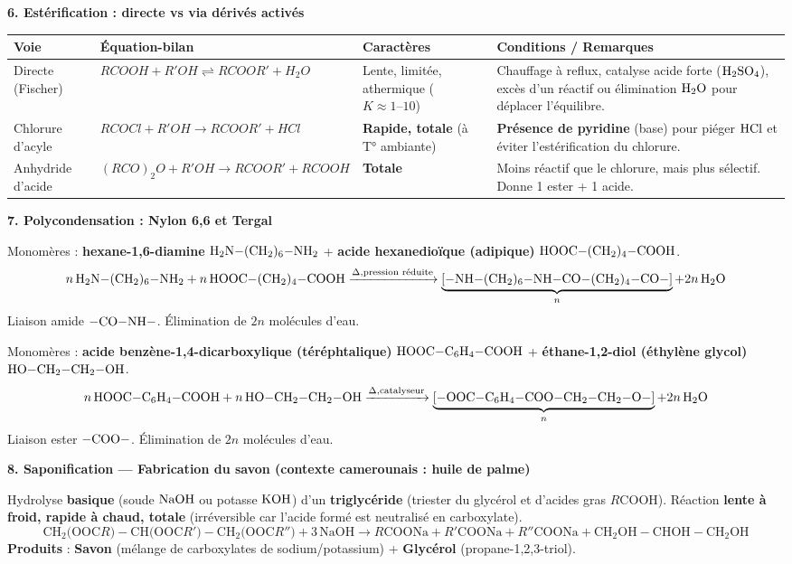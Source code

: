 \documentclass[11pt]{article}
\begin{document}
\begin{aretenir}
\textbf{6. Estérification : directe vs via dérivés activés}
\begin{center}
\begin{tabularx}{\linewidth}{|l|X|X|X|}
\hline
\rowcolor{popblueL} \textbf{Voie} & \textbf{Équation-bilan} & \textbf{Caractères} & \textbf{Conditions / Remarques} \\
\hline
Directe (Fischer) & $RCOOH + R'OH \rightleftharpoons RCOOR' + H_2O$ & Lente, limitée, athermique ($K \approx 1\text{--}10$) & Chauffage à reflux, catalyse acide forte ($\ce{H2SO4}$), excès d'un réactif ou élimination $\ce{H2O}$ pour déplacer l'équilibre. \\
\hline
Chlorure d'acyle & $RCOCl + R'OH \rightarrow RCOOR' + HCl$ & \textbf{Rapide, totale} (à T° ambiante) & \textbf{Présence de pyridine} (base) pour piéger $\ce{HCl}$ et éviter l'estérification du chlorure. \\
\hline
Anhydride d'acide & $(RCO)_2O + R'OH \rightarrow RCOOR' + RCOOH$ & \textbf{Totale} & Moins réactif que le chlorure, mais plus sélectif. Donne 1 ester + 1 acide. \\
\hline
\end{tabularx}
\end{center}

\textbf{7. Polycondensation : Nylon 6,6 et Tergal}
\begin{exemplebox}
Monomères : \textbf{hexane-1,6-diamine} $\ce{H2N-(CH2)6-NH2}$ + \textbf{acide hexanedioïque (adipique)} $\ce{HOOC-(CH2)4-COOH}$.
\[ n\,\ce{H2N-(CH2)6-NH2} + n\,\ce{HOOC-(CH2)4-COOH} \xrightarrow{\Delta, \text{pression réduite}} \underbrace{\ce{[-NH-(CH2)6-NH-CO-(CH2)4-CO-]}}_n + 2n\,\ce{H2O} \]
Liaison amide $\ce{-CO-NH-}$. Élimination de $2n$ molécules d'eau.
\end{exemplebox}

\begin{exemplebox}
Monomères : \textbf{acide benzène-1,4-dicarboxylique (téréphtalique)} $\ce{HOOC-C6H4-COOH}$ + \textbf{éthane-1,2-diol (éthylène glycol)} $\ce{HO-CH2-CH2-OH}$.
\[ n\,\ce{HOOC-C6H4-COOH} + n\,\ce{HO-CH2-CH2-OH} \xrightarrow{\Delta, \text{catalyseur}} \underbrace{\ce{[-OOC-C6H4-COO-CH2-CH2-O-]}}_n + 2n\,\ce{H2O} \]
Liaison ester $\ce{-COO-}$. Élimination de $2n$ molécules d'eau.
\end{exemplebox}

\textbf{8. Saponification — Fabrication du savon (contexte camerounais : huile de palme)}
\begin{definition}[Saponification]
Hydrolyse \textbf{basique} (soude $\ce{NaOH}$ ou potasse $\ce{KOH}$) d'un \textbf{triglycéride} (triester du glycérol et d'acides gras $R\mathrm{COOH}$). Réaction \textbf{lente à froid, rapide à chaud, totale} (irréversible car l'acide formé est neutralisé en carboxylate).
\[
\mathrm{CH_2(OOC}R)-\mathrm{CH(OOC}R')-\mathrm{CH_2(OOC}R'') + 3\,\mathrm{NaOH} \rightarrow
R\mathrm{COONa} + R'\mathrm{COONa} + R''\mathrm{COONa} + \mathrm{CH_2OH-CHOH-CH_2OH}
\]
\textbf{Produits} : \textbf{Savon} (mélange de carboxylates de sodium/potassium) + \textbf{Glycérol} (propane-1,2,3-triol).
\end{definition}


\end{aretenir}
\end{document}
